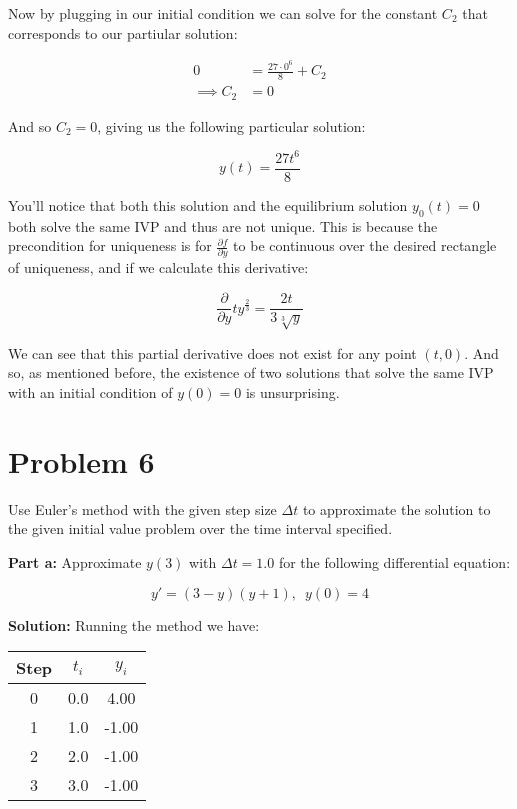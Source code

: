 \documentclass{article}
\begin{document}
Now by plugging in our initial condition we can solve for the constant $C_2$ that corresponds to our partiular solution:

\begin{align*}
    0&=\frac{27\cdot0^6}{8}+C_2\tag{$(t,y)=(0,0)$}\\
    \implies C_2&=0
\end{align*}

And so $C_2=0$, giving us the following particular solution:

\begin{equation*}
    y(t)=\frac{27t^6}{8}
\end{equation*}

You'll notice that both this solution and the equilibrium solution $y_0(t)=0$ both solve the same IVP and thus are not unique. This is because the precondition for uniqueness is for $\frac{\partial f}{\partial y}$ to be continuous over the desired rectangle of uniqueness, and if we calculate this derivative:

\begin{equation*}
    \frac{\partial}{\partial y}ty^{\frac{2}{3}}=\frac{2t}{3\sqrt[3]{y}}
\end{equation*}

We can see that this partial derivative does not exist for any point $(t,0)$. And so, as mentioned before, the existence of two solutions that solve the same IVP with an initial condition of $y(0)=0$ is unsurprising.

\section*{Problem 6}
Use Euler’s method with the given step size $\Delta t$ to approximate the solution to the given initial value problem over the time interval specified.
\bigskip

\noindent\textbf{Part a:} Approximate $y(3)$ with $\Delta t=1.0$ for the following differential equation:

\begin{equation*}
    y'=(3-y)(y+1),\,\,\,y(0)=4
\end{equation*}
\smallskip

\noindent\textbf{Solution:} Running the method we have:

\begin{center}
\begin{tabular}{c|c|c}
        Step & $t_i$ & $y_i$\\
        \hline
        0 & 0.0 & 4.00\\
        1 & 1.0 & -1.00\\
        2 & 2.0 & -1.00\\
        3 & 3.0 & -1.00\\
\end{tabular}
\end{center}
\end{document}
